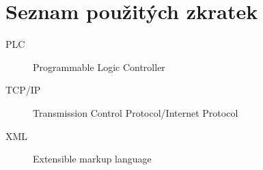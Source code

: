 \chapter{Seznam použitých zkratek}
\begin{description}
	\item[PLC] Programmable Logic Controller
	\item[TCP/IP] Transmission Control Protocol/Internet Protocol 
	\item[XML] Extensible markup language
\end{description}